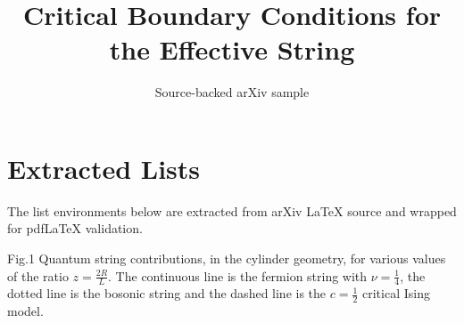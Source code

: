 \documentclass[11pt]{article}
\title{Critical Boundary Conditions for the Effective String}
\author{Source-backed arXiv sample}
\date{}
\begin{document}
\maketitle
\section{Extracted Lists}

The list environments below are extracted from arXiv LaTeX source and wrapped for pdfLaTeX validation.

\begin{description}

\item{Fig.1}
Quantum string contributions, in the cylinder  geometry, for various
values of the ratio $z=\frac{2R}{L}$. The continuous line is the fermion
string with $\nu=\frac{1}{4}$, the dotted line is the bosonic string and
the dashed line is the $c=\frac{1}{2}$ critical Ising model.
\end{description}
\end{document}
